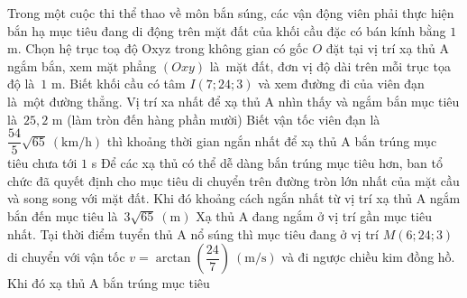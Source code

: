 \begin{ex}%
	Trong một cuộc thi thể thao về môn bắn súng, các vận động viên phải thực hiện bắn hạ mục tiêu đang di động trên mặt đất của khối cầu đặc có bán kính bằng $1$ m. Chọn hệ trục toạ độ Oxyz trong không gian có gốc $O$ đặt tại vị trí xạ thủ A ngắm bắn, xem mặt phẳng $(Oxy)$ là~mặt đất, đơn vị độ dài trên mỗi trục  tọa độ là~$1$ m. Biết khối cầu có tâm $I(7;24;3)$ và xem đường đi của viên đạn là~một đường thẳng.
	\choiceTF 
		{\True Vị trí xa nhất để xạ thủ  A nhìn thấy và ngắm bắn mục tiêu là~$25{,}2$ m (làm tròn đến hàng phần mười)}
		{\True Biết vận tốc viên đạn là~$\dfrac{54}{5}\sqrt{65} \ (\text{km/h})$ thì khoảng thời gian ngắn nhất để  xạ thủ A bắn trúng mục tiêu chưa tới $1$ s}
		{\True Để các xạ thủ có thể dễ dàng bắn trúng mục tiêu hơn, ban tổ chức đã quyết định cho mục tiêu di chuyển trên đường tròn lớn nhất của mặt cầu và song song với mặt  đất. Khi đó khoảng cách ngắn nhất từ vị trí xạ thủ A ngắm bắn đến mục tiêu là~$ 3\sqrt{65} \ (\text{m})$}
		{\True Xạ thủ A đang ngắm ở vị trí gần mục tiêu nhất. Tại thời điểm tuyển thủ A nổ súng thì mục tiêu đang ở vị trí $M(6;24;3)$ di  chuyển với vận tốc $v = \arctan\left(\dfrac{24}{7}\right) \ (\text{m/s})$ và đi ngược chiều kim đồng hồ. Khi đó xạ thủ A bắn trúng mục tiêu}
\end{ex}
